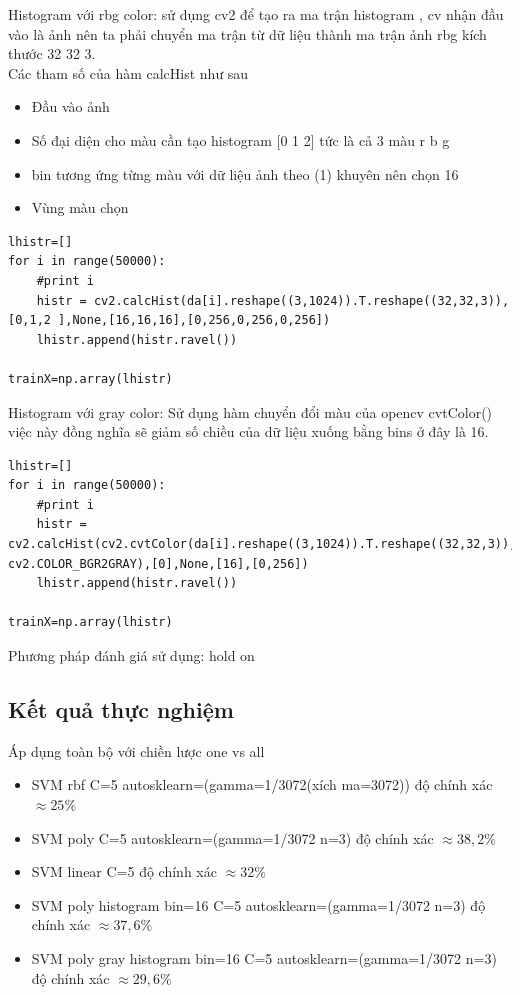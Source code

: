 \documentclass[a4paper,12pt]{report}
\begin{document}
Histogram với rbg color: sử dụng cv2 để tạo ra ma trận histogram , cv nhận đầu vào là ảnh nên ta phải chuyển ma trận từ dữ liệu thành ma trận ảnh rbg kích thước 32 32 3. \\
Các tham số của hàm  calcHist như sau 
\begin{itemize}
\item Đầu vào ảnh 
\item Số đại diện cho màu cần tạo histogram [0 1 2] tức là cả 3 màu r b g
\item bin tương ứng từng màu với dữ liệu ảnh theo (1) khuyên nên chọn 16 
\item Vùng màu chọn 
\end{itemize}
\begin{lstlisting}
lhistr=[]
for i in range(50000):
    #print i
    histr = cv2.calcHist(da[i].reshape((3,1024)).T.reshape((32,32,3)),[0,1,2 ],None,[16,16,16],[0,256,0,256,0,256])        
    lhistr.append(histr.ravel())

trainX=np.array(lhistr)
\end{lstlisting}
Histogram với gray color:
Sử dụng hàm chuyển đổi màu của opencv cvtColor() việc này đồng nghĩa sẽ giảm số chiều của dữ liệu xuống bằng bins ở đây là 16.
\begin{lstlisting}
lhistr=[]
for i in range(50000):
    #print i
    histr = cv2.calcHist(cv2.cvtColor(da[i].reshape((3,1024)).T.reshape((32,32,3)), cv2.COLOR_BGR2GRAY),[0],None,[16],[0,256])
    lhistr.append(histr.ravel())

trainX=np.array(lhistr)
\end{lstlisting}
Phương pháp đánh giá sử dụng: hold on
\subsection{Kết quả thực nghiệm}
Áp dụng toàn bộ với chiền lược one vs all
\begin{itemize}
\item SVM rbf C=5 autosklearn=(gamma=1/3072(xích ma=3072)) độ chính xác $\approx 25 \%$  
\item SVM poly C=5 autosklearn=(gamma=1/3072 n=3) độ chính xác $\approx 38,2 \%$
\item SVM linear C=5  độ chính xác $\approx 32 \%$    
\item SVM poly histogram bin=16 C=5 autosklearn=(gamma=1/3072 n=3) độ chính xác $\approx 37,6 \%$
\item SVM poly gray histogram bin=16 C=5 autosklearn=(gamma=1/3072 n=3) độ chính xác $\approx 29,6 \%$
\end{itemize}
\end{document}
